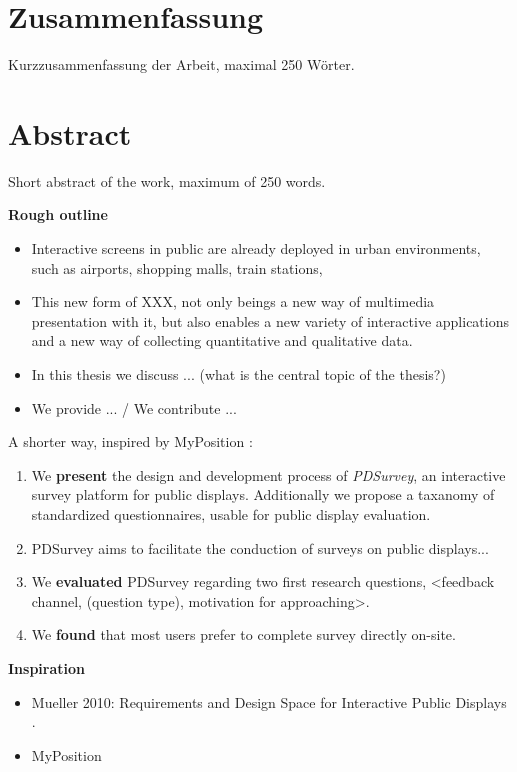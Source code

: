 
\section*{Zusammenfassung}

Kurzzusammenfassung der Arbeit, maximal 250 W\"orter.

\section*{Abstract}

Short abstract of the work, maximum of 250 words.




\textbf{Rough outline}

	\begin{itemize}
	\item Interactive screens in public are already deployed in urban environments, such as airports, shopping malls, train stations, 
	\item This new form of XXX, not only beings a new way of multimedia presentation with it, but also enables a new variety of interactive applications and a new way of collecting quantitative and qualitative data.

	\item In this thesis we discuss ... (what is the central topic of the thesis?)
	\item We provide ... / We contribute ...

	\end{itemize}




	A shorter way, inspired by MyPosition \cite{valkanova2014myposition}:

	\begin{enumerate}
	\item We \textbf{present} the design and development process of \textit{PDSurvey}, an interactive survey platform for public displays. Additionally we propose a taxanomy of standardized questionnaires, usable for public display evaluation.

	\item PDSurvey aims to facilitate the conduction of surveys on public displays...
	\item We \textbf{evaluated} PDSurvey regarding two first research questions, <feedback channel, (question type), motivation for approaching>.

	\item We \textbf{found} that most users prefer to complete survey directly on-site.
	\end{enumerate}







\textbf{Inspiration}

	\begin{itemize}
	\item Mueller 2010: Requirements and Design Space for Interactive Public Displays \cite{muller2010requirements}.
	\item MyPosition \cite{valkanova2014myposition}
	\end{itemize}
